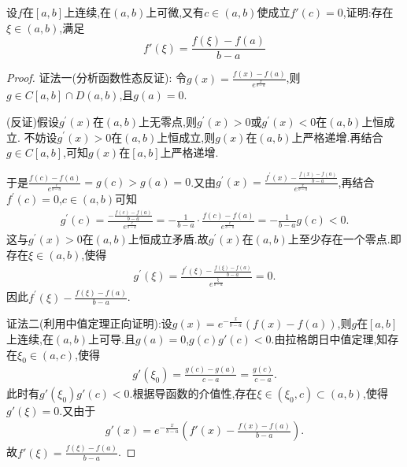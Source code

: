 \documentclass[lang=cn,newtx,10pt,scheme=chinese]{../Template/elegantbook}
\begin{document}
\begin{exercise}
    设\(f\)在\([a,b]\)上连续,在\((a,b)\)上可微,又有\(c\in(a,b)\)使成立\(f'(c) = 0\),证明:存在\(\xi\in(a,b)\),满足
    \[
    f'(\xi)=\frac{f(\xi)-f(a)}{b - a}
    \]
\end{exercise}
\begin{proof}
    {\color{blue}证法一(分析函数性态反证):}
    令\(g(x) = \frac{f(x) - f(a)}{e^{\frac{x}{b - a}}}\),则\(g\in C[a,b] \cap D(a,b)\),且\(g(a) = 0\).

    (反证)假设\(g^{\prime}(x)\)在\((a,b)\)上无零点,则\(g^{\prime}(x) > 0\)或\(g^{\prime}(x) < 0\)在\((a,b)\)上恒成立.
    不妨设\(g^{\prime}(x) > 0\)在\((a,b)\)上恒成立,则\(g(x)\)在\((a,b)\)上严格递增.再结合\(g\in C[a,b]\),可知\(g(x)\)在\([a,b]\)上严格递增.
    
    于是\(\frac{f(c) - f(a)}{e^{\frac{c}{b - a}}} = g(c) > g(a) = 0\).又由\(g^{\prime}(x) = \frac{f^{\prime}(x) - \frac{f(x) - f(a)}{b - a}}{e^{\frac{x}{b - a}}}\),再结合\(f^{\prime}(c) = 0\),\(c\in (a,b)\)可知
    \begin{align*}
        g^{\prime}(c) = \frac{-\frac{f(c) - f(a)}{b - a}}{e^{\frac{c}{b - a}}} = -\frac{1}{b - a} \cdot \frac{f(c) - f(a)}{e^{\frac{c}{b - a}}} = -\frac{1}{b - a}g(c) < 0.
    \end{align*}
    这与\(g^{\prime}(x) > 0\)在\((a,b)\)上恒成立矛盾.故\(g^{\prime}(x)\)在\((a,b)\)上至少存在一个零点.即存在\(\xi \in (a,b)\),使得
    \begin{align*}
        g^{\prime}(\xi) = \frac{f^{\prime}(\xi) - \frac{f(\xi) - f(a)}{b - a}}{e^{\frac{\xi}{b - a}}} = 0.
    \end{align*}
    因此\(f^{\prime}(\xi) - \frac{f(\xi) - f(a)}{b - a}\). 

    {\color{blue}证法二(利用中值定理正向证明):}设\(g(x)=e^{-\frac{x}{b - a}}(f(x)-f(a))\),则\(g\)在\([a,b]\)上连续,在\((a,b)\)上可导.且\(g(a) = 0\),\(g(c)g'(c)<0\).由拉格朗日中值定理,知存在\(\xi_0\in(a,c)\),使得
    \begin{align*}
        g'(\xi_0)=\frac{g(c)-g(a)}{c - a}=\frac{g(c)}{c - a}.
    \end{align*}
    此时有\(g'(\xi_0)g'(c)<0\).根据导函数的介值性,存在\(\xi\in(\xi_0,c)\subset(a,b)\),使得\(g'(\xi)=0\).又由于
    \begin{align*}
        g'(x)=e^{-\frac{x}{b - a}}\left(f'(x)-\frac{f(x)-f(a)}{b - a}\right).
    \end{align*}
故\(f'(\xi)=\frac{f(\xi)-f(a)}{b - a}\).
\end{proof}
\end{document}
